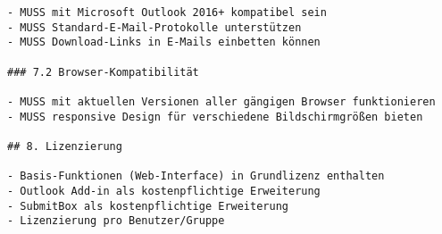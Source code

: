 \begin{Verbatim}[breaklines=true]
- MUSS mit Microsoft Outlook 2016+ kompatibel sein
- MUSS Standard-E-Mail-Protokolle unterstützen
- MUSS Download-Links in E-Mails einbetten können

### 7.2 Browser-Kompatibilität

- MUSS mit aktuellen Versionen aller gängigen Browser funktionieren
- MUSS responsive Design für verschiedene Bildschirmgrößen bieten

## 8. Lizenzierung

- Basis-Funktionen (Web-Interface) in Grundlizenz enthalten
- Outlook Add-in als kostenpflichtige Erweiterung
- SubmitBox als kostenpflichtige Erweiterung
- Lizenzierung pro Benutzer/Gruppe
\end{Verbatim}
